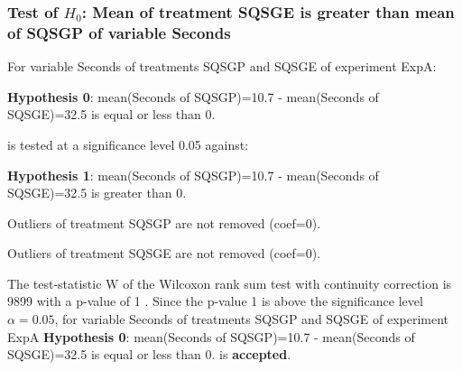 \begin{frame}[t]
 \frametitle{Test of $H_{0}$: Mean of treatment SQSGE is greater than mean of SQSGP of variable Seconds }
 \scriptsize
 For variable Seconds of treatments SQSGP and SQSGE of experiment ExpA:

\vspace{1mm}
{\bf Hypothesis 0}: mean(Seconds of SQSGP)=10.7 - mean(Seconds of SQSGE)=32.5 is equal or less than 0.


 \begin{center} is tested at a significance level 0.05 against: \end{center}

{\bf Hypothesis 1}: mean(Seconds of SQSGP)=10.7 - mean(Seconds of SQSGE)=32.5 is greater than 0.
\vspace{1mm}
\vspace{1mm}

 Outliers of treatment SQSGP  are not removed (coef=0).

 Outliers of treatment SQSGE  are not removed (coef=0).
\vspace{1mm}
 
 The test-statistic W of the Wilcoxon rank sum test with continuity correction is 9899 with a p-value of 1 .
 Since the p-value 1 is above the significance level $\alpha= 0.05 $,
 for variable Seconds of treatments SQSGP and SQSGE of experiment ExpA 
 {\bf Hypothesis 0}: mean(Seconds of SQSGP)=10.7 - mean(Seconds of SQSGE)=32.5 is equal or less than 0.
is {\bf accepted}.

 \end{frame}
